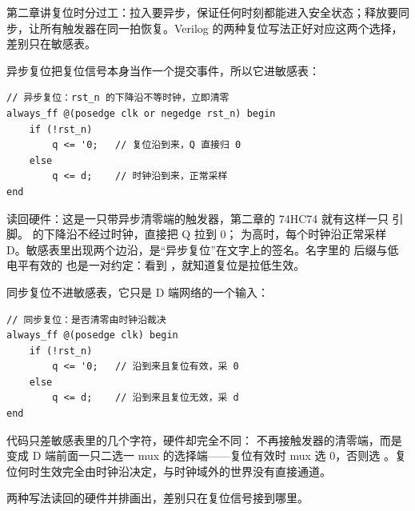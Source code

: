 
第二章讲复位时分过工：拉入要异步，保证任何时刻都能进入安全状态；释放要同步，让所有触发器在同一拍恢复。Verilog 的两种复位写法正好对应这两个选择，差别只在敏感表。

异步复位把复位信号本身当作一个提交事件，所以它进敏感表：

\begin{lstlisting}
// 异步复位：rst_n 的下降沿不等时钟，立即清零
always_ff @(posedge clk or negedge rst_n) begin
    if (!rst_n)
        q <= '0;   // 复位沿到来，Q 直接归 0
    else
        q <= d;    // 时钟沿到来，正常采样
end
\end{lstlisting}

读回硬件：这是一只带异步清零端的触发器，第二章的 74HC74 就有这样一只  引脚。 的下降沿不经过时钟，直接把 Q 拉到 0； 为高时，每个时钟沿正常采样 D。敏感表里出现两个边沿，是“异步复位”在文字上的签名。名字里的  后缀与低电平有效的  也是一对约定：看到 ，就知道复位是拉低生效。

同步复位不进敏感表，它只是 D 端网络的一个输入：

\begin{lstlisting}
// 同步复位：是否清零由时钟沿裁决
always_ff @(posedge clk) begin
    if (!rst_n)
        q <= '0;   // 沿到来且复位有效，采 0
    else
        q <= d;    // 沿到来且复位无效，采 d
end
\end{lstlisting}

代码只差敏感表里的几个字符，硬件却完全不同： 不再接触发器的清零端，而是变成 D 端前面一只二选一 mux 的选择端——复位有效时 mux 选 0，否则选 。复位何时生效完全由时钟沿决定，与时钟域外的世界没有直接通道。

两种写法读回的硬件并排画出，差别只在复位信号接到哪里。

